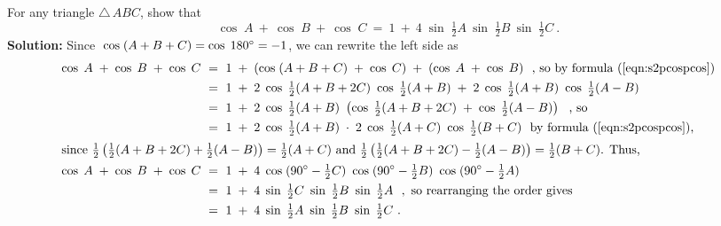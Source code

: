 \begin{exmp}\label{exmp:cosabctri}
 For any triangle $\triangle\,ABC$, show that
 \begin{displaymath}
  \cos\;A ~+~ \cos\;B ~+~ \cos\;C ~=~ 1 ~+~
   4\;\sin\;\tfrac{1}{2}A~\sin\;\tfrac{1}{2}B~\sin\;\tfrac{1}{2}C ~.
 \end{displaymath}
 \textbf{Solution:} Since $\;\cos\;(A+B+C) = \cos\;180^\circ = -1$, we can rewrite the left side as
 \begin{align*}
  \cos\;A \;+\; \cos\;B \;+\; \cos\;C ~&=~ 1 \;+\; (\cos\;(A+B+C) \;+\; \cos\;C) \;+\; (\cos\;A
   \;+\; \cos\;B)~~\text{, so by formula (\ref{eqn:s2pcospcos})}\\
  &=~ 1 \;+\; 2\;\cos\;\tfrac{1}{2}(A+B+2C)~\cos\;\tfrac{1}{2}(A+B) \;+\;
   2\;\cos\;\tfrac{1}{2}(A+B)~\cos\;\tfrac{1}{2}(A-B)\\
  &=~ 1 \;+\; 2\;\cos\;\tfrac{1}{2}(A+B)~\left( \cos\;\tfrac{1}{2}(A+B+2C) \;+\;
   \cos\;\tfrac{1}{2}(A-B) \right) ~~\text{, so}\\
  &=~ 1 \;+\; 2\;\cos\;\tfrac{1}{2}(A+B)\;\cdot\;2\;\cos\;\tfrac{1}{2}(A+C)~
   \cos\;\tfrac{1}{2}(B+C)~~\text{by formula (\ref{eqn:s2pcospcos}),}\\
  \intertext{since
  $\tfrac{1}{2}\left( \tfrac{1}{2}(A+B+2C) + \tfrac{1}{2}(A-B) \right) = \tfrac{1}{2}(A+C)$ and
  $\tfrac{1}{2}\left( \tfrac{1}{2}(A+B+2C) - \tfrac{1}{2}(A-B) \right) = \tfrac{1}{2}(B+C)$. Thus,}
  \cos\;A \;+\; \cos\;B \;+\; \cos\;C ~&=~
   1 \;+\; 4\;\cos\;(90^\circ - \tfrac{1}{2}C)~\cos\;(90^\circ - \tfrac{1}{2}B)~
   \cos\;(90^\circ - \tfrac{1}{2}A)\\
  &=~ 1 \;+\; 4\;\sin\;\tfrac{1}{2}C~\sin\;\tfrac{1}{2}B~\sin\;\tfrac{1}{2}A
  ~~,\text{ so rearranging the order gives}\\
  &=~ 1 \;+\; 4\;\sin\;\tfrac{1}{2}A~\sin\;\tfrac{1}{2}B~\sin\;\tfrac{1}{2}C ~.
 \end{align*}
\end{exmp}
